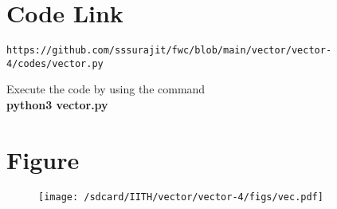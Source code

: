 \documentclass[journal,12pt,twocolumn]{IEEEtran}
\begin{document}
\section{\textbf{Code Link}}
\begin{lstlisting}
https://github.com/sssurajit/fwc/blob/main/vector/vector-4/codes/vector.py
\end{lstlisting}
Execute the code by using the command\\
\textbf{python3 vector.py}
\section{\textbf{Figure}}
\begin{figure}[!h]
\centering
\texttt{[image: /sdcard/IITH/vector/vector-4/figs/vec.pdf]}
\caption{}
\label{fig:vec}
\end{figure}
\end{document}
